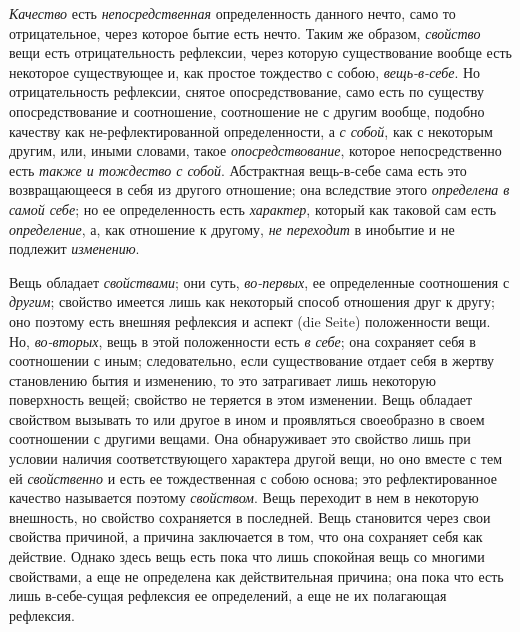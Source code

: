 {\em Качество} есть
{\em непосредственная} определенность данного нечто,
само то отрицательное, через которое бытие есть нечто. Таким же образом,
{\em свойство} вещи есть отрицательность рефлексии,
через которую существование вообще есть некоторое существующее и, как
простое тождество с собою, {\em вещь-в-себе}. Но
отрицательность рефлексии, снятое опосредствование, само есть по существу
опосредствование и соотношение, соотношение не с другим вообще, подобно
качеству как не-рефлектированной определенности, а
{\em с собой}, как с некоторым другим, или, иными
словами, такое {\em опосредствование}, которое
непосредственно есть {\em также и тождество с собой}.
Абстрактная вещь-в-себе сама есть это возвращающееся в себя из другого
отношение; она вследствие этого {\em определена в самой
себе}; но ее определенность есть {\em характер},
который как таковой сам есть {\em определение}, а, как
отношение к другому, {\em не переходит} в инобытие и не
подлежит {\em изменению}.

Вещь обладает {\em свойствами}; они суть,
{\em во-первых}, ее определенные соотношения с
{\em другим}; свойство имеется лишь как некоторый
способ отношения друг к другу; оно поэтому есть внешняя рефлексия и аспект
(die Seite) положенности вещи. Но, {\em во-вторых},
вещь в этой положенности есть {\em в себе}; она
сохраняет себя в соотношении с иным; следовательно, если существование
отдает себя в жертву становлению бытия и изменению, то это затрагивает лишь
некоторую поверхность вещей; свойство не теряется в этом изменении. Вещь
обладает свойством вызывать то или другое в ином и проявляться своеобразно
в своем соотношении с другими вещами. Она обнаруживает это свойство лишь
при условии наличия соответствующего характера другой вещи, но оно вместе с
тем ей {\em свойственно} и есть ее тождественная с
собою основа; это рефлектированное качество называется поэтому
{\em свойством}. Вещь переходит в нем в некоторую
внешность, но свойство сохраняется в последней. Вещь становится через свои
свойства причиной, а причина заключается в том, что она сохраняет себя как
действие. Однако здесь вещь есть пока что лишь спокойная вещь со многими
свойствами, а еще не определена как действительная причина; она пока что
есть лишь в-себе-сущая рефлексия ее определений, а еще не их полагающая
рефлексия.

